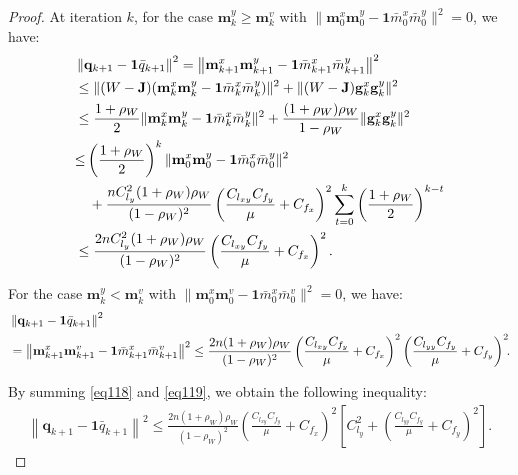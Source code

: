 \documentclass{article}
\theoremstyle{plain}
\theoremstyle{definition}
\theoremstyle{remark}
\begin{document}
\begin{proof}
At iteration $k$, for the case $\mathbf{m}_k^y \geq \mathbf{m}_k^v$ with $\| \mathbf{m}_0^x\mathbf{m}_0^y - \mathbf{1}\bar{m}_0^x\bar{m}_0^y \|^2 = 0$, we have:
\begin{align}
&\left\| \mathbf{q}_{k+1}-\mathbf{1}\bar{q}_{k+1}\right\|^2=\left\| \mathbf{m}_{k+1}^x\mathbf{m}_{k+1}^y-\mathbf{1}\bar{m}_{k+1}^x\bar{m}_{k+1}^y\right\|^2\notag\\
&\leq\| (W - \mathbf{J}) ( \mathbf{m}_{k}^x\mathbf{m}_{k}^y-\mathbf{1}\bar{m}_{k}^x\bar{m}_{k}^y)\|^2 +  \|(W - \mathbf{J}) \mathbf{g}_k^x\mathbf{g}_k^y \|^2  \notag \\
&\leq \frac{1 + \rho_W}{2} 
\| \mathbf{m}_k^x\mathbf{m}_k^y - \mathbf{1}\bar{m}_k^x\bar{m}_k^y \|^2 
+ \frac{(1 + \rho_W) \rho_W}{1 - \rho_W} \| \mathbf{g}_k^x\mathbf{g}_k^y \|^2 \notag \\
&{\leq} 
\left( \frac{1 + \rho_W}{2} \right)^k 
\| \mathbf{m}_0^x\mathbf{m}_0^y - \mathbf{1}\bar{m}_0^x\bar{m}_0^y \|^2 
\nonumber\\
&\quad+ \frac{nC_{l_y}^2 (1 + \rho_W) \rho_W}{(1 - \rho_W)^2} 
\left(\frac{C_{l_{xy}}C_{f_y}}{\mu}+C_{f_x}\right)^2\sum_{t=0}^k 
\left( \frac{1 + \rho_W}{2} \right)^{k-t} \notag \\
&\leq \frac{2nC_{l_y}^2 (1 + \rho_W) \rho_W}{(1 - \rho_W)^2}\left(\frac{C_{l_{xy}}C_{f_y}}{\mu}+C_{f_x}\right)^2.\label{eq118}
\end{align}

For the case $\mathbf{m}_k^y < \mathbf{m}_k^v$ with $\| \mathbf{m}_0^x\mathbf{m}_0^v - \mathbf{1}\bar{m}_0^x\bar{m}_0^v\|^2 = 0$, we have:
\begin{align}
&\left\| \mathbf{q}_{k+1}-\mathbf{1}\bar{q}_{k+1}\right\|^2\notag\\
&=\left\| \mathbf{m}_{k+1}^x\mathbf{m}_{k+1}^v-\mathbf{1}\bar{m}_{k+1}^x\bar{m}_{k+1}^v\right\|^2\leq \frac{2n (1 + \rho_W) \rho_W}{(1 - \rho_W)^2}\left(\frac{C_{l_{xy}}C_{f_y}}{\mu}+C_{f_x}\right)^2\left(\frac{C_{l_{yy}}C_{f_y}}{\mu}+C_{f_y}\right)^2\!\!.\label{eq119}
\end{align}

By summing \cref{eq118} and \cref{eq119}, we obtain the following inequality:
\begin{align}
\left\| \mathbf{q}_{k+1}-\mathbf{1}\bar{q}_{k+1}\right\|^2\leq \frac{2n (1 + \rho_W) \rho_W}{(1 - \rho_W)^2}\left(\frac{C_{l_{xy}}C_{f_y}}{\mu}+C_{f_x}\right)^2\left[C_{l_y}^2+\left(\frac{C_{l_{yy}}C_{f_y}}{\mu}+C_{f_y}\right)^2\right].\label{eq120}
\end{align}


\end{proof}
\end{document}
